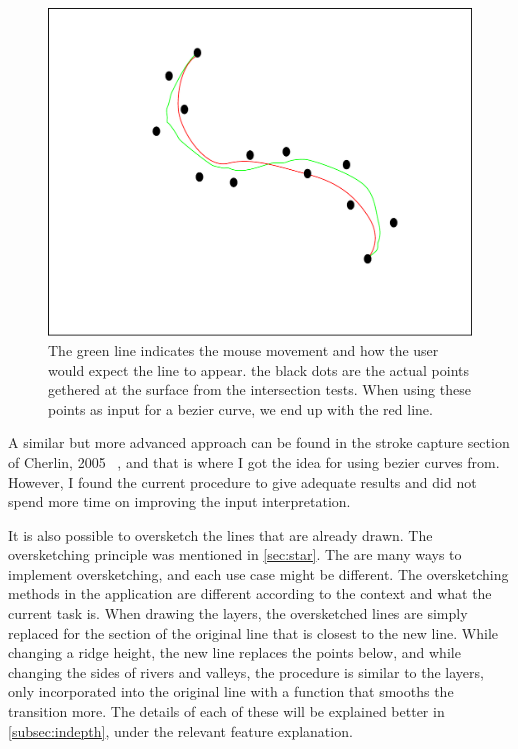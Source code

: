 \documentclass[a4paper,12pt]{report}
\newcommand{\secref}[1]{\autoref{#1}, \nameref{#1}}
\begin{document}
\begin{figure}
 \includegraphics[width=\linewidth]{thesis/bezierSmooth.pdf}
 \caption{The green line indicates the mouse movement and how the user would expect the line to appear. the black dots are the actual points gethered at the surface from the intersection tests. When using these points as input for a bezier curve, we end up with the red line.}
 \label{fig:bezierSmooth}
\end{figure}


A similar but more advanced approach can be found in the stroke capture section of Cherlin, 2005 ~\cite{Cherlin:2005:SMF:1090122.1090145}, and that is where I got the idea for using bezier curves from. However, I found the current procedure to give adequate results and did not spend more time on improving the input interpretation.

It is also possible to oversketch the lines that are already drawn. The oversketching principle was mentioned in \ref{sec:star}. The are many ways to implement oversketching, and each use case might be different. The oversketching methods in the application are different according to the context and what the current task is. When drawing the layers, the oversketched lines are simply replaced for the section of the original line that is closest to the new line. While changing a ridge height, the new line replaces the points below, and while changing the sides of rivers and valleys, the procedure is similar to the layers, only incorporated into the original line with a function that smooths the transition more. The details of each of these will be explained better in \secref{subsec:indepth} under the relevant feature explanation.
\end{document}
